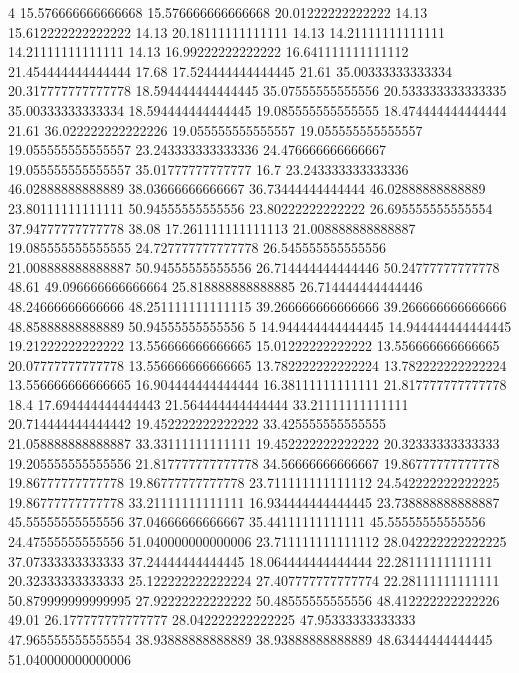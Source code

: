 4 15.576666666666668 15.576666666666668 20.01222222222222 14.13 15.612222222222222 14.13 20.18111111111111 14.13 14.21111111111111 14.21111111111111 14.13 16.99222222222222 16.641111111111112 21.454444444444444 17.68 17.524444444444445 21.61 35.00333333333334 20.317777777777778 18.594444444444445 35.07555555555556 20.533333333333335 35.00333333333334 18.594444444444445 19.085555555555555 18.474444444444444 21.61 36.022222222222226 19.055555555555557 19.055555555555557 19.055555555555557 23.243333333333336 24.476666666666667 19.055555555555557 35.01777777777777 16.7 23.243333333333336 46.02888888888889 38.03666666666667 36.73444444444444 46.02888888888889 23.80111111111111 50.94555555555556 23.80222222222222 26.695555555555554 37.94777777777778 38.08 17.261111111111113 21.008888888888887 19.085555555555555 24.727777777777778 26.545555555555556 21.008888888888887 50.94555555555556 26.714444444444446 50.24777777777778 48.61 49.096666666666664 25.818888888888885 26.714444444444446 48.24666666666666 48.251111111111115 39.266666666666666 39.266666666666666 48.85888888888889 50.94555555555556
5 14.944444444444445 14.944444444444445 19.21222222222222 13.556666666666665 15.01222222222222 13.556666666666665 20.07777777777778 13.556666666666665 13.782222222222224 13.782222222222224 13.556666666666665 16.904444444444444 16.38111111111111 21.817777777777778 18.4 17.694444444444443 21.564444444444444 33.21111111111111 20.714444444444442 19.452222222222222 33.425555555555555 21.058888888888887 33.33111111111111 19.452222222222222 20.32333333333333 19.205555555555556 21.817777777777778 34.56666666666667 19.86777777777778 19.86777777777778 19.86777777777778 23.711111111111112 24.542222222222225 19.86777777777778 33.21111111111111 16.934444444444445 23.738888888888887 45.55555555555556 37.04666666666667 35.44111111111111 45.55555555555556 24.47555555555556 51.040000000000006 23.711111111111112 28.042222222222225 37.07333333333333 37.24444444444445 18.064444444444444 22.28111111111111 20.32333333333333 25.122222222222224 27.407777777777774 22.28111111111111 50.879999999999995 27.92222222222222 50.48555555555556 48.412222222222226 49.01 26.177777777777777 28.042222222222225 47.95333333333333 47.965555555555554 38.93888888888889 38.93888888888889 48.63444444444445 51.040000000000006
